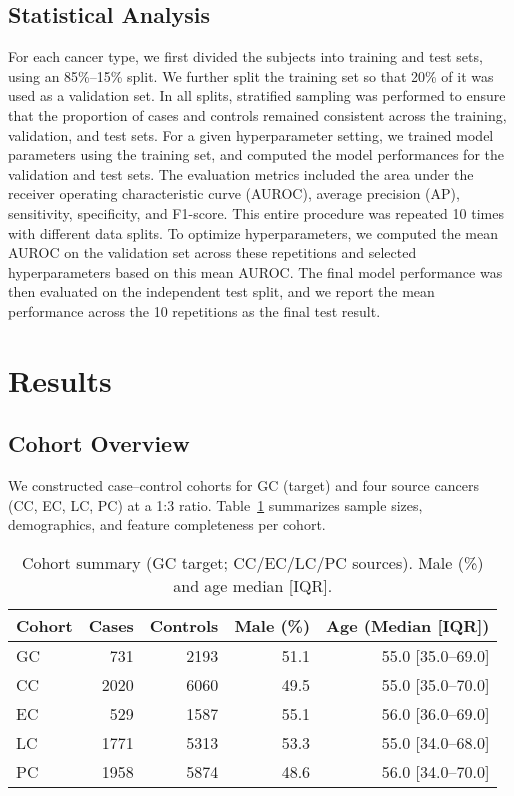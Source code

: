 \documentclass[diagnostics,article,submit,pdftex,moreauthors]{Definitions/mdpi}
\begin{document}
\subsection{Statistical Analysis}
For each cancer type, we first divided the subjects into training and test sets, using an 85\%--15\% split. 
We further split the training set so that 20\% of it was used as a validation set. 
In all splits, stratified sampling was performed to ensure that the proportion of cases and controls remained consistent across the training, validation, and test sets. 
For a given hyperparameter setting, we trained model parameters using the training set, and computed the model performances for the validation and test sets. 
The evaluation metrics included the area under the receiver operating characteristic curve (AUROC), average precision (AP), sensitivity, specificity, and F1-score. 
This entire procedure was repeated 10 times with different data splits. 
To optimize hyperparameters, we computed the mean AUROC on the validation set across these repetitions and selected hyperparameters based on this mean AUROC. 
The final model performance was then evaluated on the independent test split, and we report the mean performance across the 10 repetitions as the final test result. 



\section{Results}


\subsection{Cohort Overview}
We constructed case--control cohorts for GC (target) and four source cancers (CC, EC, LC, PC) at a 1:3 ratio.
Table~\ref{tab:cohort} summarizes sample sizes, demographics, and feature completeness per cohort.

\begin{table}[H]
\caption{Cohort summary (GC target; CC/EC/LC/PC sources). Male (\%) and age median [IQR].}
\label{tab:cohort}
\centering
\begin{tabular}{lrrrr}
\toprule
Cohort & Cases & Controls & Male (\%) & Age (Median [IQR]) \\
\midrule
GC & 731 & 2193 & 51.1 & 55.0 [35.0–69.0] \\
CC & 2020 & 6060 & 49.5 & 55.0 [35.0–70.0] \\
EC & 529 & 1587 & 55.1 & 56.0 [36.0–69.0] \\
LC & 1771 & 5313 & 53.3 & 55.0 [34.0–68.0] \\
PC & 1958 & 5874 & 48.6 & 56.0 [34.0–70.0] \\
\bottomrule
\end{tabular}

\end{table}
\end{document}
